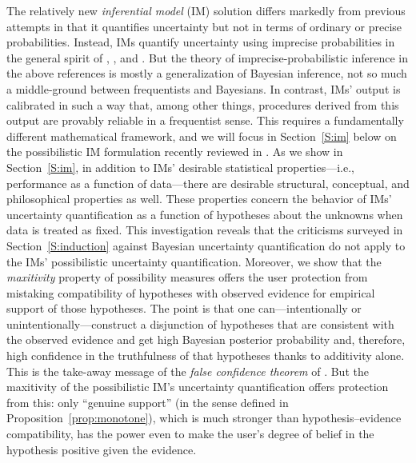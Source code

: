 \documentclass[a4paper, 12pt]{article}
\theoremstyle{plain}
\theoremstyle{definition}
\theoremstyle{remark}
\begin{document}
The relatively new {\em inferential model} (IM) solution \citep[e.g.,][]{imbasics, imbook} differs markedly from previous attempts in that it quantifies uncertainty but not in terms of ordinary or precise probabilities.  Instead, IMs quantify uncertainty using imprecise probabilities in the general spirit of \citet{levi1980}, \citet{walley1991}, and \citet{imprecise.prob.book}.  But the theory of imprecise-probabilistic inference in the above references is mostly a generalization of Bayesian inference, not so much a middle-ground between frequentists and Bayesians.  In contrast, IMs' output is calibrated in such a way that, among other things, procedures derived from this output are provably reliable in a frequentist sense.  This requires a fundamentally different mathematical framework, and we will focus in Section~\ref{S:im} below on the possibilistic IM formulation recently reviewed in \citet{imreview}.  As we show in Section~\ref{S:im}, in addition to IMs' desirable statistical properties---i.e., performance as a function of data---there are desirable structural, conceptual, and philosophical properties as well.  These properties concern the behavior of IMs' uncertainty quantification as a function of hypotheses about the unknowns when data is treated as fixed.  This investigation reveals that the criticisms surveyed in Section~\ref{S:induction} against Bayesian uncertainty quantification do not apply to the IMs' possibilistic uncertainty quantification.  Moreover, we show that the {\em maxitivity} property of possibility measures offers the user protection from mistaking compatibility of hypotheses with observed evidence for empirical support of those hypotheses.  The point is that one can---intentionally or unintentionally---construct a disjunction of hypotheses that are consistent with the observed evidence and get high Bayesian posterior probability and, therefore, high confidence in the truthfulness of that hypotheses thanks to additivity alone.  This is the take-away message of the {\em false confidence theorem} of \citet{balch.martin.ferson.2017}.  But the maxitivity of the possibilistic IM's uncertainty quantification offers protection from this: only ``genuine support'' (in the sense defined in Proposition~\ref{prop:monotone}), which is much stronger than hypothesis--evidence compatibility, has the power even to make the user's degree of belief in the hypothesis positive given the evidence.   
\end{document}

